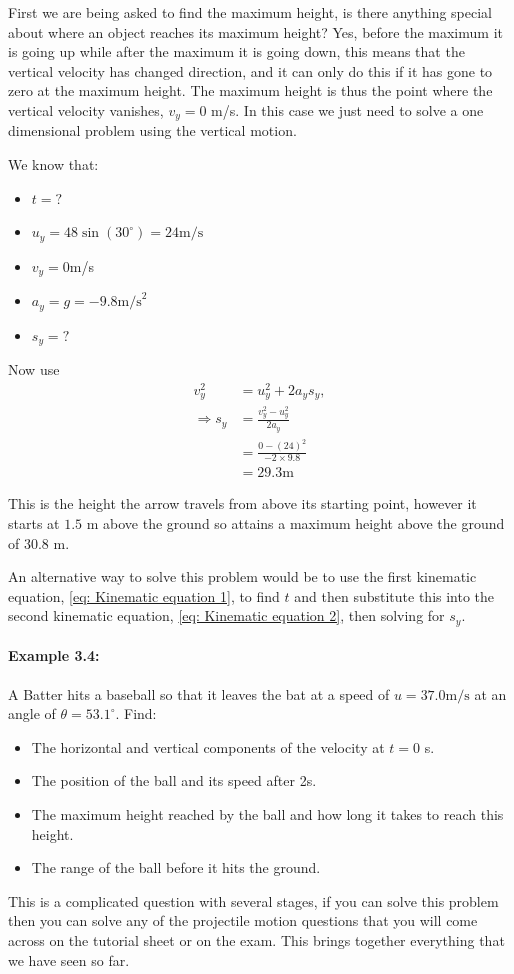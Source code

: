 First we are being asked to find the maximum height, is there anything special about where an object reaches its maximum height? Yes, before the maximum it is going up while after the maximum it is going down, this means that the vertical velocity has changed direction, and it can only do this if it has gone to zero at the maximum height. The maximum height is thus the point where the vertical velocity vanishes, $v_{y}=0$ m/s. In this case we just need to solve a one dimensional problem using the vertical motion. 

We know that:
\begin{itemize}
\setlength{\itemsep}{-5pt}
    \item $t=?$
\item $u_{y}=48\sin\left(30^{\circ}\right)=24\text{m/s}$
\item $v_{y}=0$m/s
\item $a_{y}=g=-9.8\text{m/s}^{2}$
\item $s_{y}=?$
\end{itemize}

Now use
\begin{align*}
v_{y}^{2}&=u_{y}^{2}+2a_{y}s_{y},\\
\Rightarrow s_{y}&=\frac{v_{y}^{2}-u_{y}^{2}}{2a_{y}}\\
&=\frac{0-(24)^{2}}{-2\times 9.8}\\
&=29.3\text{m}
\end{align*}

This is the height the arrow travels from above its starting point, however it starts at $1.5$ m above the ground so attains a maximum height above the ground of $30.8$ m. 

An alternative way to solve this problem would be to use the first kinematic equation, \cref{eq: Kinematic equation 1}, to find $t$ and then substitute this into the second kinematic equation, \cref{eq: Kinematic equation 2}, then solving for $s_{y}$.\\



\paragraph{Example 3.4:} A Batter hits a baseball so that it leaves the bat at a speed of $u=37.0\text{m/s}$ at an angle of $\theta=53.1^{\circ}$. Find:
\begin{itemize}
\setlength{\itemsep}{-5pt}
    \item[a)] The horizontal and vertical components of the velocity at $t=0$ s.
    \item[b)] The position of the ball and its speed after 2s.
    \item[c)] The maximum height reached by the ball and how long it takes to reach this height.
    \item[d)] The range of the ball before it hits the ground.
\end{itemize}
This is a complicated question with several stages, if you can solve this problem then you can solve any of the projectile motion questions that you will come across on the tutorial sheet or on the exam. This brings together everything that we have seen so far.

